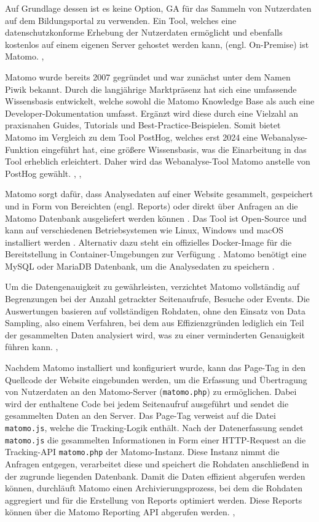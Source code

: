 Auf Grundlage dessen ist es keine Option, GA für das Sammeln von Nutzerdaten auf dem Bildungsportal zu verwenden. Ein Tool, welches eine datenschutzkonforme Erhebung der Nutzerdaten ermöglicht und ebenfalls kostenlos auf einem eigenen Server gehostet werden kann, (engl. On-Premise) ist Matomo. \parencite{Förster2024}, \parencite{MatomoFree}

Matomo wurde bereits 2007 gegründet und war zunächst unter dem Namen Piwik bekannt. Durch die langjährige Marktpräsenz hat sich eine umfassende Wissensbasis entwickelt, welche sowohl die Matomo Knowledge Base als auch eine Developer-Dokumentation umfasst. Ergänzt wird diese durch eine Vielzahl an praxisnahen Guides, Tutorials und Best-Practice-Beispielen. Somit bietet Matomo im Vergleich zu dem Tool PostHog, welches erst 2024 eine Webanalyse-Funktion eingeführt hat, eine größere Wissensbasis, was die Einarbeitung in das Tool erheblich erleichtert. Daher wird das Webanalyse-Tool Matomo anstelle von PostHog gewählt. \parencite{MatomoKnowledgeBase}, \parencite{Förster2024}, \parencite{MatomoDevelop}

Matomo sorgt dafür, dass Analysedaten auf einer Website gesammelt, gespeichert und in Form von Bereichten (engl. Reports) oder direkt über Anfragen an die Matomo Datenbank ausgeliefert werden können \parencite{MatomoHowItWorks}. Das Tool ist Open-Source und kann auf verschiedenen Betriebsystemen wie Linux, Windows und macOS installiert werden \parencite{MatomoRequirements}. Alternativ dazu steht ein offizielles Docker-Image für die Bereitstellung in Container-Umgebungen zur Verfügung \parencite{MatomoDocker}. Matomo benötigt eine MySQL oder MariaDB Datenbank, um die Analysedaten zu speichern \parencite{MatomoRequirements}. 

Um die Datengenauigkeit zu gewährleisten, verzichtet Matomo vollständig auf Begrenzungen bei der Anzahl getrackter Seitenaufrufe, Besuche oder Events. Die Auswertungen basieren auf vollständigen Rohdaten, ohne den Einsatz von Data Sampling, also einem Verfahren, bei dem aus Effizienzgründen lediglich ein Teil der gesammelten Daten analysiert wird, was zu einer verminderten Genauigkeit führen kann. \parencite{PiwikProDataSampling}, \parencite{MatomoDataLimits}

Nachdem Matomo installiert und konfiguriert wurde, kann das Page-Tag in den Quellcode der Website eingebunden werden, um die Erfassung und Übertragung von Nutzerdaten an den Matomo-Server (\texttt{matomo.php}) zu ermöglichen. Dabei wird der enthaltene Code bei jedem Seitenaufruf ausgeführt und sendet die gesammelten Daten an den Server. Das Page-Tag verweist auf die Datei \texttt{matomo.js}, welche die Tracking-Logik enthält. Nach der Datenerfassung sendet \texttt{matomo.js} die gesammelten Informationen in Form einer HTTP-Request an die Tracking-API \texttt{matomo.php} der Matomo-Instanz. Diese Instanz nimmt die Anfragen entgegen, verarbeitet diese und speichert die Rohdaten anschließend in der zugrunde liegenden Datenbank. Damit die Daten effizient abgerufen werden können, durchläuft Matomo einen Archivierungsprozess, bei dem die Rohdaten aggregiert und für die Erstellung von Reports optimiert werden. Diese Reports können über die Matomo Reporting API abgerufen werden. \parencite{MatomoHowItWorks}, \parencite{MatomoTrackingClient}

